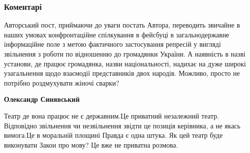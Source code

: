  
 
 
 
 
\subsubsection{Коментарі}
\label{sec:27_07_2021.fb.muharskij_antin.1.kiev_ksenofobia_teatr.cmt}

\begin{itemize}
 

Авторський пост, приймаючи до уваги постать Автора, переводить звичайне в наших
умовах конфронтаційне спілкування в фейсбуці в загальнодержавне інформаційне
поле з метою фактичного застосування репресій у вигляді звільнення з роботи по
відношенню до громадянки України. А наявність в назві установи, де працює
громадянка, назви національності, надихає на дуже широкі узагальнення щодо
взаємодії представників двох народів. Можливо, просто не потрібно роздмухувати
жіночі сварки?

\begin{itemize}
 
\textbf{Олександр Синявський} 

Театр де вона працює не є державним.Це приватний незалежний театр. Відповідно
звільнення чи незвільнення звідти це позиція керівника, а не якась вимога.Це в
моральній площині Правда є одна штука. Як цей театр буде виконувати Закон про
мову? Це вже не приватна розмова.



 

\end{itemize}
\end{itemize}
